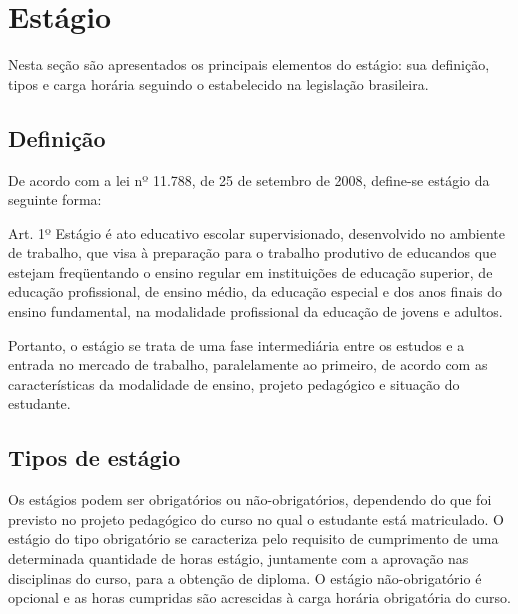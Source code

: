 \section{Estágio}
Nesta seção são apresentados os principais elementos do estágio: sua definição, tipos e carga horária seguindo o estabelecido na legislação brasileira.
\subsection{Definição}
De acordo com a lei nº 11.788, de 25 de setembro de 2008, define-se estágio da seguinte forma:
\begin{quoting}[rightmargin=0cm,leftmargin=4cm]
	\begin{SingleSpace}
	{\footnotesize
	Art. 1º  Estágio é ato educativo escolar supervisionado, desenvolvido no ambiente de trabalho, que visa à preparação para o trabalho produtivo de educandos que estejam freqüentando o ensino regular em instituições de educação superior, de educação profissional, de ensino médio, da educação especial e dos anos finais do ensino fundamental, na modalidade profissional da educação de jovens e adultos. \cite{leiestagio}
	}
	\end{SingleSpace}
\end{quoting}

Portanto, o estágio se trata de uma fase intermediária entre os estudos e a entrada no mercado de trabalho, paralelamente ao primeiro, de acordo com as características da modalidade de ensino, projeto pedagógico e situação do estudante.

\subsection{Tipos de estágio}
Os estágios podem ser obrigatórios ou não-obrigatórios, dependendo do que foi previsto no projeto pedagógico do curso no qual o estudante está matriculado. O estágio do tipo obrigatório se caracteriza pelo requisito de cumprimento de uma determinada quantidade de horas estágio, juntamente com a aprovação nas disciplinas do curso, para a obtenção de diploma. O estágio não-obrigatório é opcional e as horas cumpridas são acrescidas à carga horária obrigatória do curso. \cite{leiestagio}

